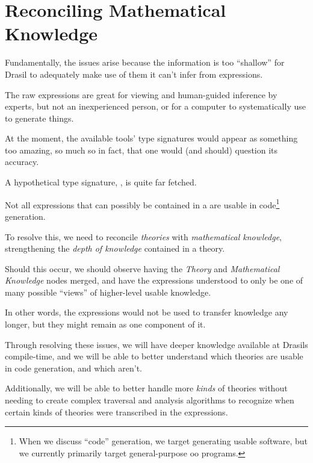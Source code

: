 \section{Reconciling Mathematical Knowledge}

Fundamentally, the issues arise because the information is too ``shallow'' for
Drasil to adequately make use of them \textemdash{} it can't infer from
expressions.

The raw expressions are great for viewing and human-guided inference by experts,
but not an inexperienced person, or for a computer to systematically use to
generate things.

At the moment, the available tools' type signatures would appear as something
too amazing, so much so in fact, that one would (and should) question its
accuracy.

A hypothetical type signature, , is quite far
fetched.

Not all expressions that can possibly be contained in a \RelationConcept{} are
usable in code\footnote{When we discuss ``code'' generation, we target
generating usable software, but we currently primarily target general-purpose
\acs{oo} programs.} generation.










To resolve this, we need to reconcile \textit{theories} with
\textit{mathematical knowledge}, strengthening the \textit{depth of knowledge}
contained in a theory.

Should this occur, we should observe  having the
\textit{Theory} and \textit{Mathematical Knowledge} nodes merged, and have the
expressions understood to only be one of many possible ``views'' of higher-level
usable knowledge.

In other words, the expressions would not be used to transfer knowledge any
longer, but they might remain as one component of it.

Through resolving these issues, we will have deeper knowledge available at
Drasils compile-time, and we will be able to better understand which theories
are usable in code generation, and which aren't.

Additionally, we will be able to better handle more \textit{kinds} of theories
without needing to create complex traversal and analysis algorithms to recognize
when certain kinds of theories were transcribed in the expressions.







